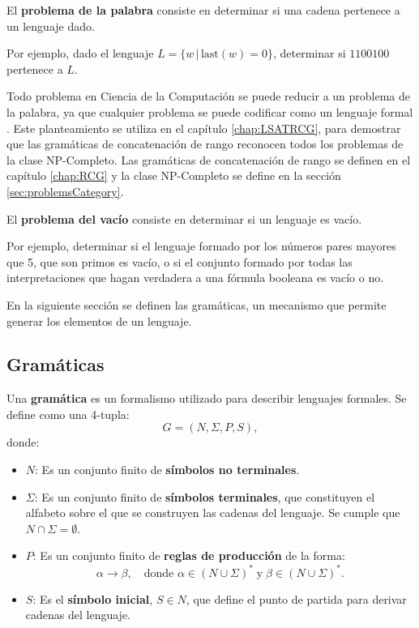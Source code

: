 \begin{definition}
  El \textbf{problema de la palabra} consiste en determinar si una cadena pertenece a un lenguaje dado. 
\end{definition}
Por ejemplo, dado el lenguaje $L=\{w\,|\,\text{last}(w)=0\}$, determinar si $1100100$ pertenece a $L$.

Todo problema en Ciencia de la Computación se puede reducir a un problema de la palabra, 
ya que cualquier problema se puede codificar como un lenguaje formal \cite{authomataTheory}. Este planteamiento
se utiliza en el capítulo \ref{chap:LSATRCG}, para demostrar que las gramáticas de concatenación de rango
reconocen todos los problemas de la clase NP-Completo. Las gramáticas de concatenación de rango se definen en el 
capítulo \ref{chap:RCG} y la clase NP-Completo se define en la sección \ref{sec:problemsCategory}.

\begin{definition} 
  El \textbf{problema del vacío} consiste en determinar si un lenguaje es vacío.
\end{definition}
Por ejemplo, determinar si el lenguaje formado por los números pares mayores que 5, que son primos es vacío, o si el conjunto formado por todas las interpretaciones que hagan verdadera a una fórmula booleana es vacío o no.

En la siguiente sección se definen las gramáticas, un mecanismo que permite generar los elementos de un lenguaje.

\subsection{Gramáticas}
\label{sec:grammars}

\begin{definition}
  Una \textbf{gramática} es un formalismo utilizado para describir lenguajes formales. Se define como una 4-tupla:
  \[
    G = (N, \Sigma, P, S),
  \]
  donde:
  \begin{itemize}
    \item \(N\): Es un conjunto finito de \textbf{símbolos no terminales}.
    \item \(\Sigma\): Es un conjunto finito de \textbf{símbolos terminales}, que constituyen el alfabeto sobre el que se construyen las cadenas del lenguaje. Se cumple que \(N \cap \Sigma = \emptyset\).
    \item \(P\): Es un conjunto finito de \textbf{reglas de producción} de la forma:
          \[
            \alpha \to \beta, \quad \text{donde } \alpha \in (N \cup \Sigma)^* \;\text{y}\; \beta \in (N \cup \Sigma)^*.
          \]
          
    \item \(S\): Es el \textbf{símbolo inicial}, \(S \in N\), que define el punto de partida para derivar cadenas del lenguaje.
  \end{itemize}
\end{definition}


